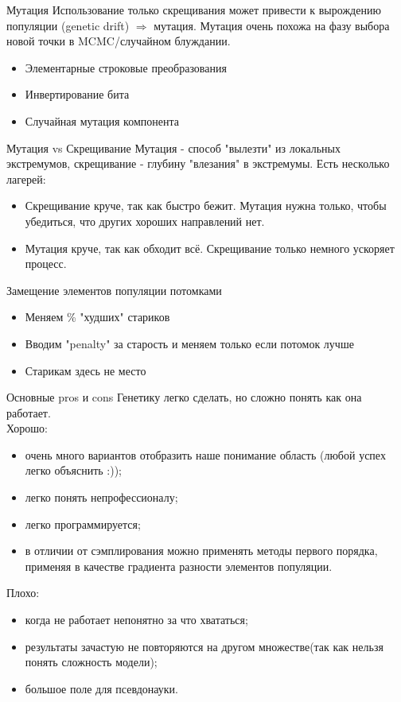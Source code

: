 \documentclass[14pt, fleqn, xcolor={dvipsnames, table}]{beamer}
\begin{document}
\begin{frame}{Мутация}
Использование только скрещивания может привести к вырождению популяции (genetic drift) $\Rightarrow$ мутация.
Мутация очень похожа на фазу выбора новой точки в MCMC/случайном блуждании.
\begin{itemize}
  \item Элементарные строковые преобразования
  \item Инвертирование бита
  \item Случайная мутация компонента
\end{itemize}
\end{frame}

\begin{frame}{Мутация vs Скрещивание}
Мутация - способ "вылезти" из локальных экстремумов, скрещивание - глубину "влезания" в экстремумы. Есть несколько лагерей:
\begin{itemize}
  \item Скрещивание круче, так как быстро бежит. Мутация нужна только, чтобы убедиться, что других хороших направлений нет.
  \item Мутация круче, так как обходит всё. Скрещивание только немного ускоряет процесс.
\end{itemize}
\end{frame}

\begin{frame}{Замещение элементов популяции потомками}
\begin{itemize}
  \item Меняем \% "худших" стариков 
  \item Вводим "penalty" за старость и меняем только если потомок лучше
  \item Старикам здесь не место
\end{itemize}
\end{frame}

\begin{frame}{Основные pros и cons}
\footnotesize
Генетику легко сделать, но сложно понять как она работает. \\
Хорошо:
\begin{itemize}
  \item очень много вариантов отобразить наше понимание область (любой успех легко объяснить :));
  \item легко понять непрофессионалу;
  \item легко программируется;
  \item в отличии от сэмплирования можно применять методы первого порядка, применяя в качестве градиента разности элементов популяции.
\end{itemize}
Плохо:
\begin{itemize}
  \item когда не работает непонятно за что хвататься;
  \item результаты зачастую не повторяются на другом множестве(так как нельзя понять сложность модели);
  \item большое поле для псевдонауки.
\end{itemize}
\end{frame}
\end{document}
